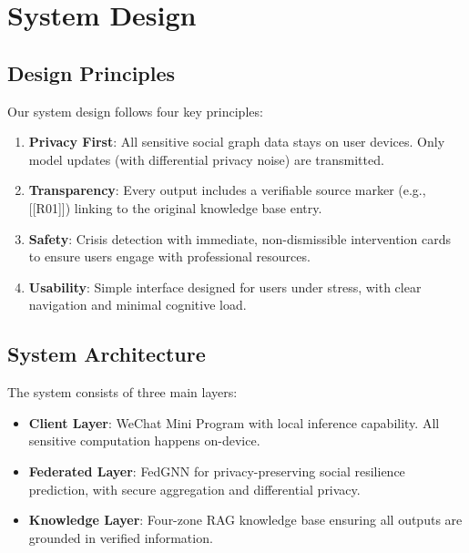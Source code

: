 \documentclass[preprint,12pt]{elsarticle}
\begin{document}
\section{System Design}

\subsection{Design Principles}

Our system design follows four key principles:

\begin{enumerate}
    \item \textbf{Privacy First}: All sensitive social graph data stays on user devices.
          Only model updates (with differential privacy noise) are transmitted.

    \item \textbf{Transparency}: Every output includes a verifiable source marker
          (e.g., [[R01]]) linking to the original knowledge base entry.

    \item \textbf{Safety}: Crisis detection with immediate, non-dismissible intervention
          cards to ensure users engage with professional resources.

    \item \textbf{Usability}: Simple interface designed for users under stress,
          with clear navigation and minimal cognitive load.
\end{enumerate}

\subsection{System Architecture}

The system consists of three main layers:

\begin{itemize}
    \item \textbf{Client Layer}: WeChat Mini Program with local inference capability.
          All sensitive computation happens on-device.

    \item \textbf{Federated Layer}: FedGNN for privacy-preserving social resilience
          prediction, with secure aggregation and differential privacy.

    \item \textbf{Knowledge Layer}: Four-zone RAG knowledge base ensuring all outputs
          are grounded in verified information.
\end{itemize}
\end{document}
